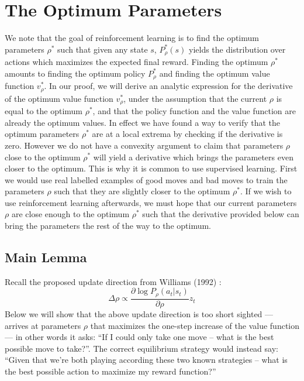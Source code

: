 \documentclass[11pt]{article}
\begin{document}
\section{The Optimum Parameters}
We note that the goal of reinforcement learning is to find the optimum parameters $\rho^*$ such that
given any state $s$, $P^*_\rho(s)$ yields the distribution over actions which maximizes the expected final
reward. Finding the optimum $\rho^*$ amounts to finding the optimum policy $P^*_\rho$ and finding the
optimum value function $v^*_\rho$.
In our proof, we will derive an analytic expression for the derivative of the optimum value
function $v^*_\rho$, under the assumption that the current $\rho$ is equal to the optimum $\rho^*$, and that the
policy function and the value function are already the optimum values.
In effect we have found a way to verify that the optimum parameters $\rho^*$ are at a local extrema
by checking if the derivative is zero. However we do not have a convexity argument to claim that
parameters $\rho$ close to the optimum $\rho^*$ will yield a derivative which brings the parameters even
closer to the optimum.
This is why it is common to use supervised learning. First we would use real labelled examples
of good moves and bad moves to train the parameters $\rho$ such that they are slightly closer to the
optimum $\rho^*$. If we wish to use reinforcement learning afterwards, we must hope that our current
parameters $\rho$ are close enough to the optimum $\rho^*$ such that the derivative provided below can bring the
parameters the rest of the way to the optimum.

\subsection{Main Lemma}
Recall the proposed update direction from Williams (1992) \cite{williams1992}:
\begin{equation}
\Delta\rho \propto \frac{\partial\log P_\rho(a_t|s_t)}{\partial \rho} z_t
\tag{1 revisited}
\end{equation}
Below we will show that the above update direction is too short sighted --- arrives at parameters
$\rho$ that maximizes the one-step increase of the value function --- in other words it asks: ``If I could
only take one move -- what is the best possible move to take?''. The correct equilibrium strategy
would instead say: ``Given that we’re both playing according these two known strategies -- what
is the best possible action to maximize my reward function?''
\end{document}
